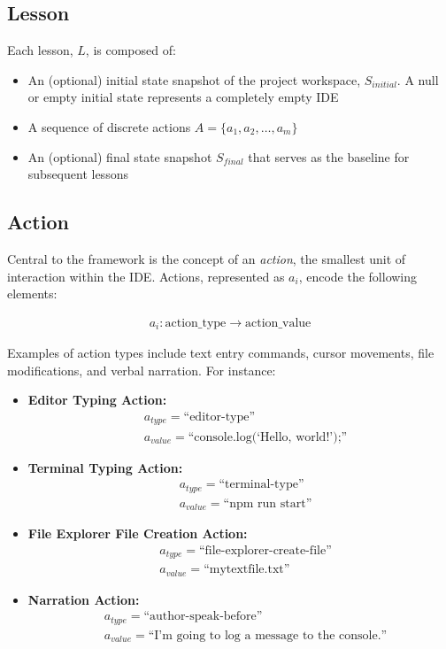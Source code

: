 \documentclass[11pt, a4paper]{article}
\begin{document}
\subsection{Lesson}

Each lesson, \( L \), is composed of:
\begin{itemize}
    \item An (optional) initial state snapshot of the project workspace, \( S_{initial} \). A null or empty initial state represents a completely empty IDE
    \item A sequence of discrete actions \( A = \{ a_1, a_2, \dots, a_m \} \)
    \item An (optional) final state snapshot \( S_{final} \) that serves as the baseline for subsequent lessons
\end{itemize}

\subsection{Action}

Central to the framework is the concept of an \textit{action}, the smallest unit of interaction within the IDE. Actions, represented as \( a_i \), encode the following elements:

\begin{align*}
    a_i : \text{action\_type} \rightarrow \text{action\_value}
\end{align*}

Examples of action types include text entry commands, cursor movements, file modifications, and verbal narration. For instance:

\begin{itemize}
    \item \textbf{Editor Typing Action:} 
    \begin{align*}
        & a_{type} = \text{``editor-type''} \\
        & a_{value} = \text{``console.log(`Hello, world!');''}
    \end{align*}
    \item \textbf{Terminal Typing Action:} 
    \begin{align*}
        & a_{type} = \text{``terminal-type''} \\
        & a_{value} = \text{``npm run start''}
    \end{align*}
    \item \textbf{File Explorer File Creation Action:} 
    \begin{align*}
        & a_{type} = \text{``file-explorer-create-file''} \\
        & a_{value} = \text{``mytextfile.txt''}
    \end{align*}
    \item \textbf{Narration Action:} 
    \begin{align*}
        & a_{type} = \text{``author-speak-before''} \\
        & a_{value} = \text{``I'm going to log a message to the console.''}
    \end{align*}
\end{itemize}
\end{document}
